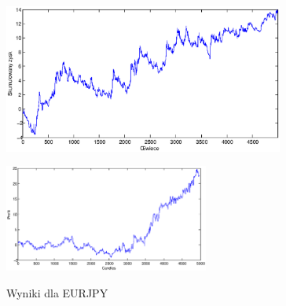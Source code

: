 \begin{figure}[h]
\begin{minipage}{.49\linewidth}
\centering
\includegraphics[width=0.82\textwidth]{images/S1d_eurjpy.eps}
\label{mansard}
\end{minipage}
\begin{minipage}{\linewidth}
\centering
\includegraphics[width=0.6\textwidth]{images/S1s_eurjpy.eps}
\label{mansard}
\end{minipage}
\caption{Wyniki dla EURJPY}
\end{figure}
\FloatBarrier


